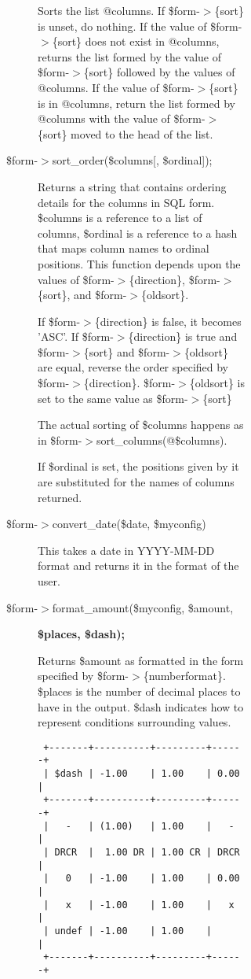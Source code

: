 \begin{description}
\begin{description}
\begin{description}
\begin{description}
\begin{description}
\begin{description}
Sorts the list @columns.  If \$form-$>$\{sort\} is unset, do nothing.  If the value
of \$form-$>$\{sort\} does not exist in @columns, returns the list formed by the
value of \$form-$>$\{sort\} followed by the values of @columns.  If the value of
\$form-$>$\{sort\} is in @columns, return the list formed by @columns with the value
of \$form-$>$\{sort\} moved to the head of the list.


\item[{\$form-$>$sort\_order(\$columns[, \$ordinal]);}] \mbox{}

Returns a string that contains ordering details for the columns in SQL form.
\$columns is a reference to a list of columns, \$ordinal is a reference to a hash
that maps column names to ordinal positions.  This function depends upon the
values of \$form-$>$\{direction\}, \$form-$>$\{sort\}, and \$form-$>$\{oldsort\}.



If \$form-$>$\{direction\} is false, it becomes 'ASC'.  If \$form-$>$\{direction\} is true
and \$form-$>$\{sort\} and \$form-$>$\{oldsort\} are equal, reverse the order specified by
\$form-$>$\{direction\}.  \$form-$>$\{oldsort\} is set to the same value as \$form-$>$\{sort\}



The actual sorting of \$columns happens as in \$form-$>$sort\_columns(@\$columns).



If \$ordinal is set, the positions given by it are substituted for the names of
columns returned.


\item[{\$form-$>$convert\_date(\$date, \$myconfig)}] \mbox{}

This takes a date in YYYY-MM-DD format and returns it in the format of the user.


\item[{\$form-$>$format\_amount(\$myconfig, \$amount,}] \textbf{\$places, \$dash);}

Returns \$amount as formatted in the form specified by \$form-$>$\{numberformat\}.
\$places is the number of decimal places to have in the output.  \$dash indicates
how to represent conditions surrounding values.

\begin{verbatim}
 +-------+----------+---------+------+
 | $dash | -1.00    | 1.00    | 0.00 |
 +-------+----------+---------+------+
 |   -   | (1.00)   | 1.00    |   -  |
 | DRCR  |  1.00 DR | 1.00 CR | DRCR |
 |   0   | -1.00    | 1.00    | 0.00 |
 |   x   | -1.00    | 1.00    |   x  |
 | undef | -1.00    | 1.00    |      |
 +-------+----------+---------+------+
\end{verbatim}



\end{description}
\end{description}
\end{description}
\end{description}
\end{description}
\end{description}
